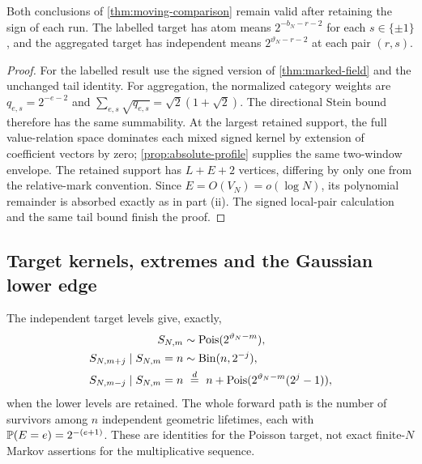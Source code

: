 \begin{corollary}\label{cor:signed-growing}
Both conclusions of \cref{thm:moving-comparison} remain valid after retaining
the sign of each run. The labelled target has atom means $2^{-b_N-r-2}$
for each $s\in\{\pm1\}$, and the aggregated target has independent means
$2^{\vartheta_N-r-2}$ at each pair $(r,s)$.
\end{corollary}
\begin{proof}
For the labelled result use the signed version of \cref{thm:marked-field}
and the unchanged tail identity. For aggregation, the normalized category
weights are $q_{e,s}=2^{-e-2}$ and
$\sum_{e,s}\sqrt{q_{e,s}}=\sqrt2(1+\sqrt2)$.
The directional Stein bound therefore has the same summability.
At the largest retained support, the full value-relation space dominates
each mixed signed kernel by extension of coefficient vectors by zero;
\cref{prop:absolute-profile} supplies the same two-window envelope.
The retained support has $L+E+2$ vertices, differing by only one from the
relative-mark convention. Since $E=O(V_N)=o(\log N)$, its polynomial
remainder is absorbed exactly as in part (ii). The signed local-pair calculation and the same tail bound finish
the proof.
\end{proof}

\subsection{Target kernels, extremes and the Gaussian lower edge}
The independent target levels give, exactly,
\begin{align}
 S_{N,m}&\sim\operatorname{Pois}(2^{\vartheta_N-m}),\label{eq:target-marginal}\\
 S_{N,m+j}\mid S_{N,m}=n&\sim\operatorname{Bin}(n,2^{-j}),\label{eq:target-forward}\\
 S_{N,m-j}\mid S_{N,m}=n&\ \stackrel d=\ n+
      \operatorname{Pois}(2^{\vartheta_N-m}(2^j-1)),\label{eq:target-reverse}
\end{align}
when the lower levels are retained. The whole forward path is the number
of survivors among $n$ independent geometric lifetimes, each with
$\mathbb P(E=e)=2^{-(e+1)}$. These are identities for the Poisson target, not
exact finite-$N$ Markov assertions for the multiplicative sequence.

